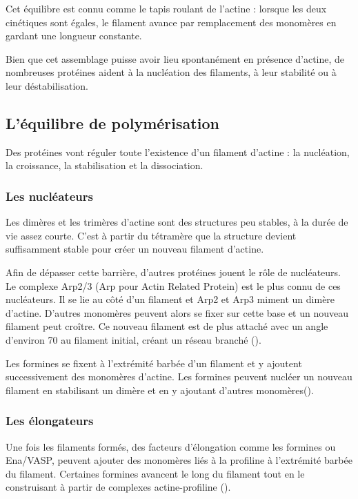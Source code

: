 Cet équilibre est connu comme le \og tapis roulant \fg de l'actine : lorsque les deux cinétiques sont égales, le filament avance par remplacement des monomères en gardant une longueur constante. 

Bien que cet assemblage puisse avoir lieu spontanément en présence d'actine, de nombreuses protéines aident à la nucléation des filaments, à leur stabilité ou à leur déstabilisation. 

\subsection{L'équilibre de polymérisation}

Des protéines vont réguler toute l'existence d'un filament d'actine : la nucléation, la croissance, la stabilisation et la dissociation. 

\subsubsection{Les nucléateurs}
Les dimères et les trimères d'actine sont des structures peu stables, à la durée de vie assez courte. C'est à partir du tétramère que la structure devient suffisamment stable pour créer un nouveau filament d'actine. 

Afin de dépasser cette barrière, d'autres protéines jouent le rôle de nucléateurs. Le complexe Arp2/3 (Arp pour Actin Related Protein) est le plus connu de ces nucléateurs. Il se lie au côté d'un filament et Arp2 et Arp3 miment un dimère d'actine. D'autres monomères peuvent alors se fixer sur cette base et un nouveau filament peut croître. Ce nouveau filament est de plus attaché avec un angle d'environ 70 \degres au filament initial, créant un réseau branché (\cite{blanchoin_direct_2000}). 

Les formines se fixent à l'extrémité barbée d'un filament et y ajoutent successivement des monomères d'actine. Les formines peuvent nucléer un nouveau filament en stabilisant un dimère et en y ajoutant d'autres monomères(\cite{pring_mechanism_2003}). 

\subsubsection{Les élongateurs}

Une fois les filaments formés, des facteurs d'élongation comme les formines ou Ena/VASP, peuvent ajouter des monomères liés à la profiline à l'extrémité barbée du filament. 
Certaines formines avancent le long du filament tout en le construisant à partir de complexes actine-profiline (\cite{otomo_structural_2005}). 


